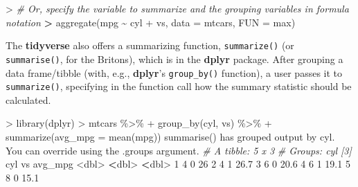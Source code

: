 \documentclass[
]{book}
\newenvironment{Shaded}{\begin{snugshade}}{\end{snugshade}}
\newcommand{\AttributeTok}[1]{\textcolor[rgb]{0.77,0.63,0.00}{#1}}
\newcommand{\CommentTok}[1]{\textcolor[rgb]{0.56,0.35,0.01}{\textit{#1}}}
\newcommand{\DecValTok}[1]{\textcolor[rgb]{0.00,0.00,0.81}{#1}}
\newcommand{\ErrorTok}[1]{\textcolor[rgb]{0.64,0.00,0.00}{\textbf{#1}}}
\newcommand{\FloatTok}[1]{\textcolor[rgb]{0.00,0.00,0.81}{#1}}
\newcommand{\FunctionTok}[1]{\textcolor[rgb]{0.00,0.00,0.00}{#1}}
\newcommand{\NormalTok}[1]{#1}
\newcommand{\SpecialCharTok}[1]{\textcolor[rgb]{0.00,0.00,0.00}{#1}}
\newcommand{\StringTok}[1]{\textcolor[rgb]{0.31,0.60,0.02}{#1}}
\begin{document}
\begin{Shaded}
\begin{Highlighting}[]
\SpecialCharTok{\textgreater{}} \CommentTok{\# Or, specify the variable to summarize and the grouping variables in formula notation}
\ErrorTok{\textgreater{}} \FunctionTok{aggregate}\NormalTok{(mpg }\SpecialCharTok{\textasciitilde{}}\NormalTok{ cyl }\SpecialCharTok{+}\NormalTok{ vs, }\AttributeTok{data =}\NormalTok{ mtcars, }\AttributeTok{FUN =}\NormalTok{ max)}
\end{Highlighting}
\end{Shaded}

The \textbf{tidyverse} also offers a summarizing function, \texttt{summarize()} (or \texttt{summarise()}, for the Britons), which is in the \textbf{dplyr} package. After grouping a data frame/tibble (with, e.g., \textbf{dplyr}'s \texttt{group\_by()} function), a user passes it to \texttt{summarize()}, specifying in the function call how the summary statistic should be calculated.

\begin{Shaded}
\begin{Highlighting}[]
\SpecialCharTok{\textgreater{}} \FunctionTok{library}\NormalTok{(dplyr)}
\SpecialCharTok{\textgreater{}}\NormalTok{ mtcars }\SpecialCharTok{\%\textgreater{}\%} 
\SpecialCharTok{+}   \FunctionTok{group\_by}\NormalTok{(cyl, vs) }\SpecialCharTok{\%\textgreater{}\%} 
\SpecialCharTok{+}   \FunctionTok{summarize}\NormalTok{(}\AttributeTok{avg\_mpg =} \FunctionTok{mean}\NormalTok{(mpg))}
\StringTok{\textasciigrave{}}\AttributeTok{summarise()}\StringTok{\textasciigrave{}}\NormalTok{ has grouped output by }\StringTok{\textquotesingle{}cyl\textquotesingle{}}\NormalTok{. You can override using the }\StringTok{\textasciigrave{}}\AttributeTok{.groups}\StringTok{\textasciigrave{}}
\NormalTok{argument.}
\CommentTok{\# A tibble: 5 x 3}
\CommentTok{\# Groups:   cyl [3]}
\NormalTok{    cyl    vs avg\_mpg}
  \SpecialCharTok{\textless{}}\NormalTok{dbl}\SpecialCharTok{\textgreater{}} \ErrorTok{\textless{}}\NormalTok{dbl}\SpecialCharTok{\textgreater{}}   \ErrorTok{\textless{}}\NormalTok{dbl}\SpecialCharTok{\textgreater{}}
\DecValTok{1}     \DecValTok{4}     \DecValTok{0}    \DecValTok{26}  
\DecValTok{2}     \DecValTok{4}     \DecValTok{1}    \FloatTok{26.7}
\DecValTok{3}     \DecValTok{6}     \DecValTok{0}    \FloatTok{20.6}
\DecValTok{4}     \DecValTok{6}     \DecValTok{1}    \FloatTok{19.1}
\DecValTok{5}     \DecValTok{8}     \DecValTok{0}    \FloatTok{15.1}
\end{Highlighting}
\end{Shaded}
\end{document}
